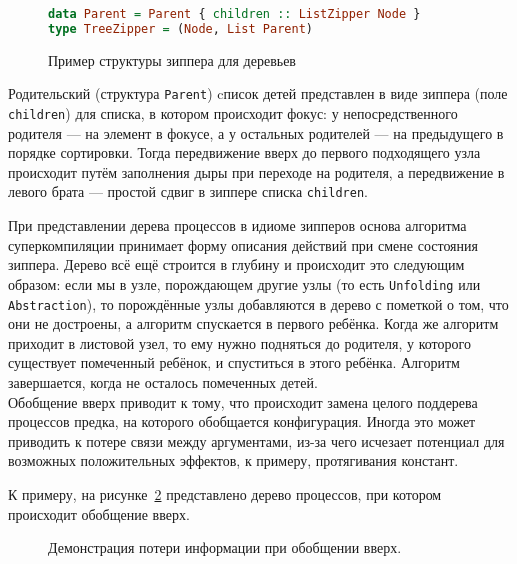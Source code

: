 \begin{figure}[h!]
\begin{lstlisting}[mathescape,language=Haskell,extendedchars=\true,frame=single,basicstyle=\ttfamily]
data Parent = Parent { children :: ListZipper Node }
type TreeZipper = (Node, List Parent)
\end{lstlisting}
\caption{Пример структуры зиппера для деревьев}
\label{fig:zipper}
\end{figure}

Родительский (структура \lstinline{Parent}) cписок детей представлен в виде зиппера (поле \lstinline{children})
для списка, в котором происходит фокус: у непосредственного родителя --- на элемент в фокусе, а у остальных
родителей --- на предыдущего в порядке сортировки.
Тогда передвижение вверх до первого подходящего узла происходит путём
заполнения дыры при переходе на родителя, а передвижение в левого брата ---
простой сдвиг в зиппере списка \lstinline{children}.

При представлении дерева процессов в идиоме зипперов основа алгоритма
суперкомпиляции принимает форму описания действий при смене состояния зиппера.
Дерево всё ещё строится в глубину и происходит это следующим образом:
если мы в узле, порождающем другие узлы (то есть \lstinline{Unfolding}
или \lstinline{Abstraction}), то порождённые узлы добавляются в дерево
с пометкой о том, что они не достроены, а алгоритм спускается в первого
ребёнка. Когда же алгоритм приходит в листовой узел, то ему нужно подняться
до родителя, у которого существует помеченный ребёнок, и спуститься в этого
ребёнка. Алгоритм завершается, когда не осталось помеченных детей. \\

Обобщение вверх приводит к тому, что происходит замена целого поддерева процессов
предка, на которого обобщается конфигурация. Иногда это может приводить к потере
связи между аргументами, из-за чего исчезает потенциал для возможных
положительных эффектов, к примеру, протягивания констант.

К примеру, на рисунке~\ref{fig:genup} представлено дерево процессов, при котором происходит обобщение вверх.

\begin{figure}[h!]
\center
{}
\caption{Демонстрация потери информации при обобщении вверх.}
\label{fig:genup}
\end{figure}

